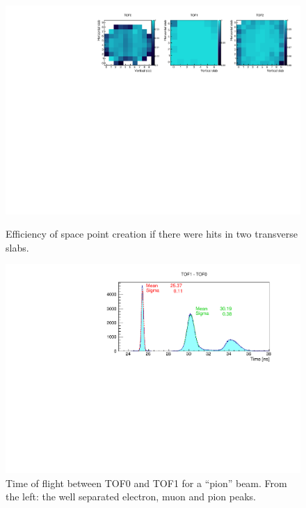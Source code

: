 \begin{figure}[!htb]
  \begin{center}
  \includegraphics[width=0.9\columnwidth]{08_sp_eff_by_pixel_2d} \\
  \caption{Efficiency of space point creation if there were hits in
    two transverse slabs.}
  \label{fig:SpEffByPixel}
  \end{center}
\end{figure}


\begin{figure}[!htb]
  \begin{center}
    \includegraphics[width=0.6\columnwidth]{TOF_peaks}
    \caption{Time of flight between TOF0 and TOF1 for a ``pion'' beam. From the left: the well separated electron, muon and pion peaks.}
    \label{fig:TOF_peaks}
  \end{center}
\end{figure}



